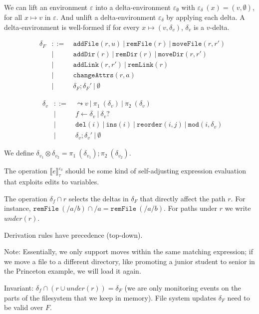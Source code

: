 \documentclass{report}
\theoremstyle{theorem}
\begin{document}
We can lift an environment $\varepsilon$ into a delta-environment $\varepsilon_\emptyset$ with $\varepsilon_\delta~(x) = (v,\emptyset)$, for all $x \mapsto v$ in $\varepsilon$.
And unlift a delta-environment $\varepsilon_\delta$ by applying each delta. A delta-environment is well-formed if for every $x \mapsto (v,\delta_v)$, $\delta_v$ is a $v$-delta.

\begin{align*}
	&\delta_F & ::= & ~\mathtt{addFile}(r,u) ~|~ \mathtt{remFile}(r) ~|~ \mathtt{moveFile}(r,r')\\
	&         & |   & ~\mathtt{addDir}(r) ~|~ \mathtt{remDir}(r) ~|~ \mathtt{moveDir}(r,r')\\
	&         & |   & ~\mathtt{addLink}(r,r') ~|~ \mathtt{remLink}(r)\\
	&         & |   & ~\mathtt{changeAttrs}(r,a)\\
	&         & |   & ~\delta_F ; {\delta_F}' ~|~ \emptyset
\end{align*}

\begin{align*}
	&\delta_v & ::= & ~\leadsto v ~|~ \pi_1~(\delta_v) ~|~ \pi_2~(\delta_v)\\
	&         & |   & ~f \leftarrow \delta_v ~|~ \delta_v?\\
	&         & |   & ~\mathtt{del}(i) ~|~ \mathtt{ins}(i) ~|~ \mathtt{reorder}(i,j) ~|~ \mathtt{mod}(i,\delta_v)\\
	&         & |   & ~\delta_v ; {\delta_v}' ~|~ \emptyset
\end{align*}

We define $\delta_{v_1} \otimes \delta_{v_2} = \pi_1~(\delta_{v_1}) ; \pi_2~(\delta_{v_2})$.

The operation $\llbracket e \rrbracket^{\varepsilon_\delta}_{\tau}$ should be some kind of self-adjusting expression evaluation that exploits edits to variables.

The operation $\delta_f \cap r$ selects the deltas in $\delta_F$ that directly affect the path $r$. For instance, $\mathtt{remFile}~(/a/b) \cap /a = \mathtt{remFile}~(/a/b)$. 
For paths under $r$ we write $under(r)$.

Derivation rules have precedence (top-down).

Note: Essentially, we only support moves within the same matching expression; if we move a file to a different directory, like promoting a junior student to senior in the Princeton example, we will load it again.

Invariant: $\delta_f \cap (r \cup under(r)) = \delta_F$ (we are only monitoring events on the parts of the filesystem that we keep in memory).
File system updates $\delta_F$ need to be valid over $F$.
\end{document}

